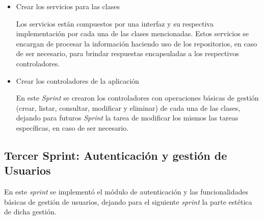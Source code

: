 \begin{enumerate}
\begin{itemize}
            \item Crear los servicios para las clases
            
            Los servicios están compuestos por una interfaz y su respectiva implementación por cada una de las clases mencionadas. Estos servicios se encargan de procesar la información haciendo uso de los repositorios, en caso de ser necesario, para brindar respuestas encapsuladas a los respectivos controladores.
            
            \item Crear los controladores de la aplicación
            
            En este \textit{Sprint} se crearon los controladores con operaciones básicas de gestión (crear, listar, consultar, modificar y eliminar) de cada una de las clases, dejando para futuros \textit{Sprint} la tarea de modificar los mismos las tareas específicas, en caso de ser necesario.
            
        \end{itemize}
    \end{enumerate}
        
        
    \subsection{Tercer Sprint: Autenticación y gestión de Usuarios}
    
    En este \textit{sprint} se implementó el módulo de autenticación y las funcionalidades básicas de gestión de usuarios, dejando para el siguiente \textit{sprint} la parte estética de dicha gestión.
    

